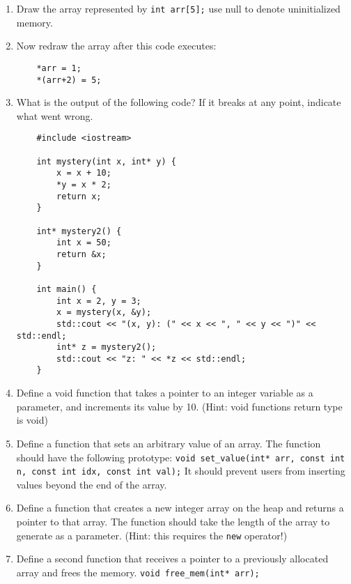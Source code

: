 \documentclass[11pt]{article}
\begin{document}
\begin{enumerate}[leftmargin=*]

\item Draw the array represented by \verb|int arr[5];| use null to denote uninitialized memory.

\item Now redraw the array after this code executes: 
\begin{verbatim}
    *arr = 1;
    *(arr+2) = 5;
\end{verbatim}

\item What is the output of the following code? If it breaks at any point, indicate what went wrong.
\begin{verbatim}
    #include <iostream>

    int mystery(int x, int* y) {
        x = x + 10;
        *y = x * 2;
        return x;
    }

    int* mystery2() {
        int x = 50;
        return &x;
    }

    int main() {
        int x = 2, y = 3;
        x = mystery(x, &y);
        std::cout << "(x, y): (" << x << ", " << y << ")" << std::endl;
        int* z = mystery2();
        std::cout << "z: " << *z << std::endl;
    }
\end{verbatim}

\item Define a void function that takes a pointer to an integer variable as a parameter, and increments its value by 10. (Hint: void functions return type is void)

\item Define a function that sets an arbitrary value of an array. The function should have the following prototype: \verb|void set_value(int* arr, const int n, const int idx, const int val);| It should prevent users from inserting values beyond the end of the array.

\item Define a function that creates a new integer array on the heap and returns a pointer to that array. The function should take the length of the array to generate as a parameter. (Hint: this requires the \verb|new| operator!)

\item Define a second function that receives a pointer to a previously allocated array and frees the memory. \verb|void free_mem(int* arr);|

\end{enumerate}
\end{document}

